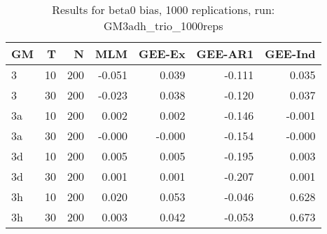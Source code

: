 \begin{table}[ht]
\centering
\begin{tabular}{lrrrrrr}
  \hline
GM & T & N & MLM & GEE-Ex & GEE-AR1 & GEE-Ind \\ 
  \hline
3 & 10 & 200 & -0.051 & 0.039 & -0.111 & 0.035 \\ 
  3 & 30 & 200 & -0.023 & 0.038 & -0.120 & 0.037 \\ 
  3a & 10 & 200 & 0.002 & 0.002 & -0.146 & -0.001 \\ 
  3a & 30 & 200 & -0.000 & -0.000 & -0.154 & -0.000 \\ 
  3d & 10 & 200 & 0.005 & 0.005 & -0.195 & 0.003 \\ 
  3d & 30 & 200 & 0.001 & 0.001 & -0.207 & 0.001 \\ 
  3h & 10 & 200 & 0.020 & 0.053 & -0.046 & 0.628 \\ 
  3h & 30 & 200 & 0.003 & 0.042 & -0.053 & 0.673 \\ 
   \hline
\end{tabular}
\caption{Results for beta0 bias, 1000 replications, run: GM3adh_trio_1000reps} 
\label{tab:beta0_bias}
\end{table}
